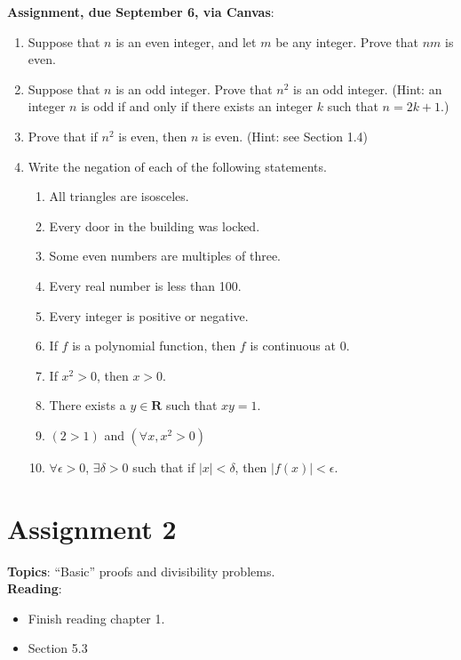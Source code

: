 \documentclass[12pt]{article}
\begin{document}
\noindent \textbf{Assignment, due September 6, via Canvas}:
\begin{enumerate}
\item Suppose that $n$ is an even integer, and let $m$ be any integer. Prove that $nm$ is even. 
\item Suppose that $n$ is an odd integer. Prove that $n^2$ is an odd integer. (Hint: an integer $n$ is odd if and only if there exists an integer $k$ such that $n = 2k+1$.)
\item Prove that if $n^2$ is even, then $n$ is even. (Hint: see Section 1.4)
\item Write the negation of each of the following statements.

 \begin{enumerate}
\item All triangles are isosceles.
\item Every door in the building was locked.
\item Some even numbers are multiples of three.
\item Every real number is less than 100.
\item Every integer is positive or negative.
\item If $f$ is a polynomial function, then $f$ is continuous at $0$.
\item If $x^2 > 0$, then $x > 0$.
\item There exists a $y \in \mathbf{R}$ such that $xy = 1$.
\item $(2 > 1)$ and $(\forall x, x^2 > 0)$
\item $\forall \epsilon > 0$, $\exists \delta > 0$ such that if $|x| < \delta$, then $|f(x)| < \epsilon$.
\end{enumerate}
\end{enumerate}

\newpage
\section[2 (due September 13): Divisibility problems.]{Assignment 2}

\textbf{Topics}: ``Basic'' proofs and divisibility problems. 
\\



\noindent \textbf{Reading}:
\begin{itemize}
\item Finish reading chapter 1.
\item Section 5.3
\end{itemize}
\end{document}
